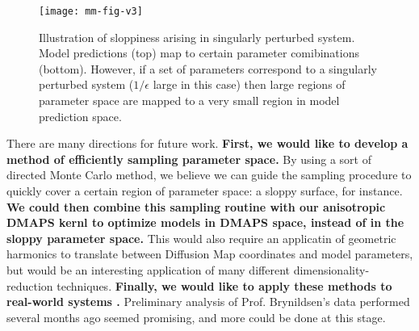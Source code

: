 \documentclass[12pt]{article}
\begin{document}
\begin{spacing}{2}
\begin{figure}[h!]
  \vspace{-5mm}
  \centering
  \texttt{[image: mm-fig-v3]}
  \caption{Illustration of sloppiness arising in singularly perturbed system. Model predictions (top) map to certain parameter comibinations (bottom). However, if a set of parameters correspond to a singularly perturbed system ($1/\epsilon$ large in this case) then large regions of parameter space are mapped to a very small region in model prediction space. \label{fig:mm}}
\end{figure}


\noindent There are many directions for future work. \textbf{First, we would like to develop a method of efficiently sampling parameter space.} By using a sort of directed Monte Carlo method, we believe we can guide the sampling procedure to quickly cover a certain region of parameter space: a sloppy surface, for instance. \textbf{We could then combine this sampling routine with our anisotropic DMAPS kernl to optimize models in DMAPS space, instead of in the sloppy parameter space.} This would also require an applicatin of geometric harmonics \cite{coifman_geometric_2006, chiavazzo_reduced_2014} to translate between Diffusion Map coordinates and model parameters, but would be an interesting application of many different dimensionality-reduction techniques. \textbf{Finally, we would like to apply these methods to real-world systems \cite{boender_risk_2007}.} Preliminary analysis of Prof. Brynildsen's data performed several months ago seemed promising, and more could be done at this stage.

\end{spacing}

% 



\end{document}

